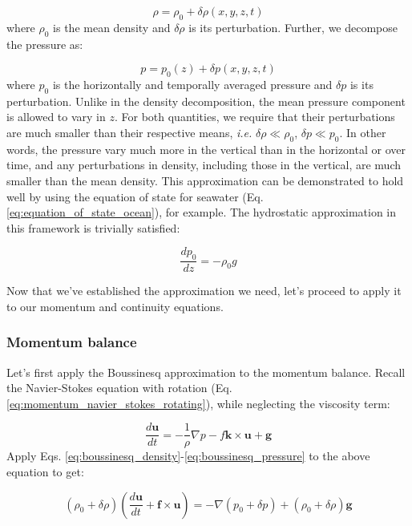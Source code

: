 \documentclass[12pt]{article}
\numberwithin{equation}{section}
\numberwithin{figure}{section}
\numberwithin{table}{section}
\begin{document}
\begin{equation}
  \rho = \rho_0 + \delta \rho(x, y, z, t)
  \label{eq:boussinesq_density}
\end{equation}
where $\rho_0$ is the mean density and $\delta \rho$ is its perturbation.
Further, we decompose the pressure as:

\begin{equation}
  p = p_0(z) + \delta p(x, y, z, t)
  \label{eq:boussinesq_pressure}
\end{equation}
where $p_0$ is the horizontally and temporally averaged pressure and $\delta p$
is its perturbation.
Unlike in the density decomposition, the mean pressure component is allowed to
vary in $z$.
For both quantities, we require that their perturbations are much smaller
than their respective means, \textit{i.e.} $\delta \rho \ll \rho_0$, $\delta p \ll p_0$.
In other words, the pressure vary much more in the vertical than in the
horizontal or over time, and any perturbations in density, including those in
the vertical, are much smaller than the mean density.
This approximation can be demonstrated to hold well by using the equation of
state for seawater (Eq. \ref{eq:equation_of_state_ocean}), for example.
The hydrostatic approximation in this framework is trivially satisfied:

\begin{equation}
  \frac{d p_0}{d z} = - \rho_0 g
  \label{eq:boussinesq_pressure_hydrostatic}
\end{equation}

Now that we've established the approximation we need, let's proceed to apply it
to our momentum and continuity equations.

\subsubsection{Momentum balance}

Let's first apply the Boussinesq approximation to the momentum balance.
Recall the Navier-Stokes equation with rotation
(Eq. \ref{eq:momentum_navier_stokes_rotating}), while neglecting the viscosity
term:

\begin{equation}
  \frac{d \mathbf{u}}{dt} = - \frac{1}{\rho} \nabla p - f \mathbf{k} \times \mathbf{u} + \mathbf{g}
\end{equation}
Apply Eqs. \ref{eq:boussinesq_density}-\ref{eq:boussinesq_pressure} to the
above equation to get:

\begin{equation}
  \left( \rho_0 + \delta \rho \right) \left( \frac{d \mathbf{u}}{dt} + \mathbf{f} \times \mathbf{u} \right) =
  - \nabla \left( p_0 + \delta p \right)
  + \left( \rho_0 + \delta \rho \right) \mathbf{g}
\end{equation}
\end{document}

